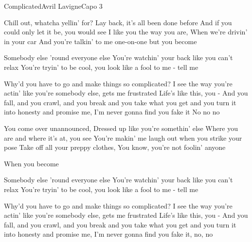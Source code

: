 \begin{song}{Complicated}{Avril Lavigne}{Capo 3}

Chill out, whatcha yellin' for? Lay back, it's all been done before
  And if you could only let it be, you would see
  I like you the way you are, When we're drivin' in your car
  And you're talkin' to me one-on-one but you become

Somebody else 'round everyone else
You're watchin' your back like you can't relax
You're tryin' to be cool, you look like a fool to me - tell me

Why'd you have to go and make things so complicated? I see the way you're
actin' like you're somebody else, gets me frustrated
Life's like this, you - And you fall, and you crawl, and you break
and you take what you get and you turn it into honesty
and promise me, I'm never gonna find you fake it
No no no

You come over unannounced, Dressed up like you're somethin' else
  Where you are and where it's at, you see
You're makin' me laugh out when you strike your pose
  Take off all your preppy clothes, You know, you're not foolin' anyone

When you become

Somebody else 'round everyone else
You're watchin' your back like you can't relax
You're tryin' to be cool, you look like a fool to me - tell me

Why'd you have to go and make things so complicated? I see the way you're
actin' like you're somebody else, gets me frustrated
Life's like this, you - And you fall, and you crawl, and you break
and you take what you get and you turn it into honesty
and promise me, I'm never gonna find you fake it, no, no


\end{song}
